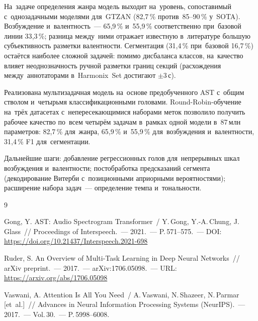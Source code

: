 \documentclass{stud-conf-pmk}
\begin{document}
\begin{paper}
На~задаче определения жанра модель выходит на~уровень, сопоставимый с~однозадачными моделями для~GTZAN (82{,}7\,\% против~85--90\,\% у~SOTA). Возбуждение и~валентность~--- 65{,}9\,\% и~55{,}9\,\% соответственно при~базовой линии 33{,}3\,\%; разница между~ними отражает известную в~литературе большую субъективность разметки валентности. Сегментация (31{,}4\,\% при~базовой 16{,}7\,\%) остаётся наиболее сложной задачей: помимо дисбаланса классов, на~качество влияет неоднозначность ручной разметки границ секций (расхождения между~аннотаторами в~Harmonix~Set достигают $\pm 3$\,с).


\conclusion

Реализована мультизадачная модель на~основе предобученного AST с~общим стволом и~четырьмя классификационными головами. Round-Robin-обучение на~трёх датасетах с~непересекающимися наборами меток позволило получить рабочее качество по~всем четырём задачам в~рамках одной модели в~87\,млн параметров: 82{,}7\,\% для~жанра, 65{,}9\,\% и~55{,}9\,\% для~возбуждения и~валентности, 31{,}4\,\% F1 для~сегментации.

Дальнейшие шаги: добавление регрессионных голов для~непрерывных шкал возбуждения и~валентности; постобработка предсказаний сегмента (декодирование Витерби с~позиционными априорными вероятностями); расширение набора задач~--- определение темпа и~тональности.


\begin{thebibliography}{9}

Gong, Y. AST: Audio Spectrogram Transformer~/ Y.\,Gong, Y.-A.\,Chung, J.\,Glass~// Proceedings of Interspeech.~--- 2021.~--- P.\,571--575.~--- DOI: \url{https://doi.org/10.21437/Interspeech.2021-698}

Ruder, S. An Overview of Multi-Task Learning in Deep Neural Networks~// arXiv preprint.~--- 2017.~--- arXiv:1706.05098.~--- URL: \url{https://arxiv.org/abs/1706.05098}

Vaswani, A. Attention Is All You Need~/ A.\,Vaswani, N.\,Shazeer, N.\,Parmar [et~al.]~// Advances in Neural Information Processing Systems (NeurIPS).~--- 2017.~--- Vol.\,30.~--- P.\,5998--6008.

\end{thebibliography}

\end{paper}
\end{document}
